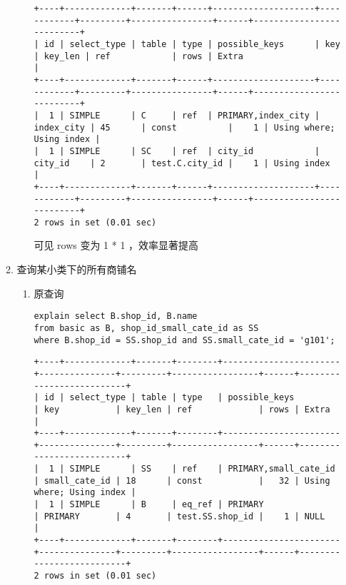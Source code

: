 \documentclass[11pt]{article}
\begin{document}
\begin{itemize}
\begin{enumerate}
\begin{enumerate}
\begin{verbatim}
+----+-------------+-------+------+--------------------+------------+---------+----------------+------+--------------------------+
| id | select_type | table | type | possible_keys      | key        | key_len | ref            | rows | Extra                    |
+----+-------------+-------+------+--------------------+------------+---------+----------------+------+--------------------------+
|  1 | SIMPLE      | C     | ref  | PRIMARY,index_city | index_city | 45      | const          |    1 | Using where; Using index |
|  1 | SIMPLE      | SC    | ref  | city_id            | city_id    | 2       | test.C.city_id |    1 | Using index              |
+----+-------------+-------+------+--------------------+------------+---------+----------------+------+--------------------------+
2 rows in set (0.01 sec)
\end{verbatim}

可见 rows 变为 1 * 1 ，效率显著提高
\end{enumerate}

\item 查询某小类下的所有商铺名
\begin{enumerate}
\item 原查询

\begin{lstlisting}
explain select B.shop_id, B.name
from basic as B, shop_id_small_cate_id as SS
where B.shop_id = SS.shop_id and SS.small_cate_id = 'g101';
\end{lstlisting}

\begin{verbatim}
+----+-------------+-------+--------+-----------------------+---------------+---------+-----------------+------+--------------------------+
| id | select_type | table | type   | possible_keys         | key           | key_len | ref             | rows | Extra                    |
+----+-------------+-------+--------+-----------------------+---------------+---------+-----------------+------+--------------------------+
|  1 | SIMPLE      | SS    | ref    | PRIMARY,small_cate_id | small_cate_id | 18      | const           |   32 | Using where; Using index |
|  1 | SIMPLE      | B     | eq_ref | PRIMARY               | PRIMARY       | 4       | test.SS.shop_id |    1 | NULL                     |
+----+-------------+-------+--------+-----------------------+---------------+---------+-----------------+------+--------------------------+
2 rows in set (0.01 sec)
\end{verbatim}


\end{enumerate}
\end{enumerate}
\end{itemize}
\end{document}
